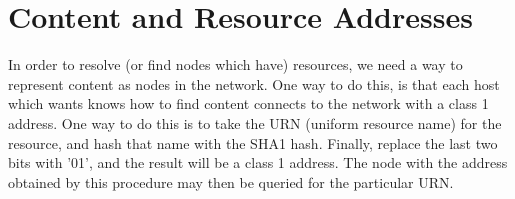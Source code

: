 \documentclass[11pt]{article}
\begin{document}
\section{Content and Resource Addresses}
In order to resolve (or find nodes which have) resources, we need a way to
represent content as nodes in the network.  One way to do this, is that each
host which wants knows how to find content connects to the network with a class
1 address.  One way to do this is to take the URN (uniform resource name) for
the resource, and hash that name with the SHA1 hash.  Finally, replace the last
two bits with '01', and the result will be a class 1 address.  The node with the
address obtained by this procedure may then be queried for the particular URN.
\end{document}
